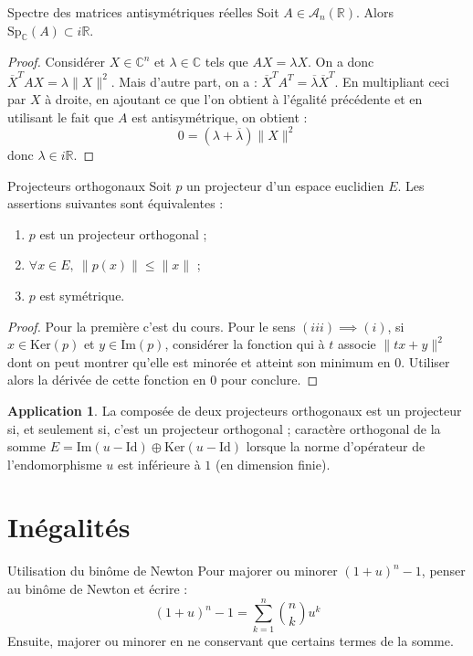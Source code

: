 \documentclass[french]{article}
\newcommand{\R}{\mathbb{R}}
\newcommand{\C}{\mathbb{C}}
\renewcommand{\ker}{\text{Ker}}
\theoremstyle{theorem}
\theoremstyle{definition}
\newtheorem*{app}{Application}
\begin{document}
\begin{lem}{Spectre des matrices antisymétriques réelles}
	Soit $A\in\mathcal{A}_n(\R)$. Alors $\text{Sp}_\C(A)\subset i\R$.
\end{lem}
\begin{proof}
	Considérer $X\in\C^n$ et $\lambda\in\C$ tels que $AX=\lambda X$. On a donc $\overline{X}^TAX=\lambda\lVert X\rVert^2$. Mais d'autre part, on a : $\overline{X}^TA^T=\overline{\lambda}\overline{X}^T$. En multipliant ceci par $X$ à droite, en ajoutant ce que l'on obtient à l'égalité précédente et en utilisant le fait que $A$ est antisymétrique, on obtient : $$0=(\lambda+\overline{\lambda})\lVert X\rVert^2$$ donc $\lambda\in i\R$.
\end{proof}

\begin{lem}{Projecteurs orthogonaux}
	Soit $p$ un projecteur d'un espace euclidien $E$. Les assertions suivantes sont équivalentes :
	\begin{enumerate}[label=(\roman*)]
		\item $p$ est un projecteur orthogonal ;
		\item $\forall x\in E,\ \lVert p(x)\rVert\leqslant\lVert x\rVert$ ;
		\item $p$ est symétrique.
	\end{enumerate}
\end{lem}
\begin{proof}
	Pour la première c'est du cours. Pour le sens $(iii)\implies (i)$, si $x\in\ker(p)$ et $y\in\text{Im}(p)$, considérer la fonction qui à $t$ associe $\lVert tx+y\rVert^2$ dont on peut montrer qu'elle est minorée et atteint son minimum en $0$. Utiliser alors la dérivée de cette fonction en $0$ pour conclure.
\end{proof}
\begin{app}
	La composée de deux projecteurs orthogonaux est un projecteur si, et seulement si, c'est un projecteur orthogonal ; caractère orthogonal de la somme $E=\text{Im}(u-\text{Id})\oplus\ker(u-\text{Id})$ lorsque la norme d'opérateur de l'endomorphisme $u$ est inférieure à $1$ (en dimension finie).
\end{app}

\section{Inégalités}

\begin{lem}{Utilisation du binôme de Newton} Pour majorer ou minorer $(1+u)^n-1$, penser au binôme de Newton et écrire : $$(1+u)^n-1=\sum_{k=1}^{n}\binom{n}{k}u^k$$ Ensuite, majorer ou minorer en ne conservant que certains termes de la somme.
\end{lem}
\end{document}
